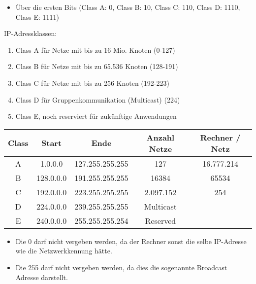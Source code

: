 \begin{itemize}
    \item Über die ersten Bits (Class A: 0, Class B: 10, Class C: 110, Class D: 1110, Class E: 1111)
\end{itemize}

IP-Adressklassen:
\begin{enumerate}
    \item Class A für Netze mit bis zu 16 Mio. Knoten (0-127)
    \item Class B für Netze mit bis zu 65.536 Knoten (128-191)
    \item Class C für Netze mit bis zu 256 Knoten (192-223)
    \item Class D für Gruppenkommunikation (Multicast) (224)
    \item Class E, noch reserviert für zukünftige Anwendungen
\end{enumerate}
\begin{center}
    \begin{tabular}{|c|c|c|c|c|}
        \hline
        Class & Start     & Ende            & Anzahl Netze & Rechner / Netz \\
        \hline
        A     & 1.0.0.0   & 127.255.255.255 & 127          & 16.777.214     \\
        \hline
        B     & 128.0.0.0 & 191.255.255.255 & 16384        & 65534          \\
        \hline
        C     & 192.0.0.0 & 223.255.255.255 & 2.097.152    & 254            \\
        \hline
        D     & 224.0.0.0 & 239.255.255.255 & Multicast    &                \\
        \hline
        E     & 240.0.0.0 & 255.255.255.254 & Reserved     &                \\
        \hline
    \end{tabular}
\end{center}

\begin{itemize}
    \item Die 0 darf nicht vergeben werden, da der Rechner sonst die selbe IP-Adresse wie die Netzwerkkennung hätte.
    \item Die 255 darf nicht vergeben werden, da dies die sogenannte Broadcast Adresse darstellt.
\end{itemize}

